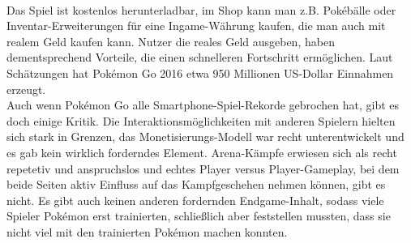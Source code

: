 \documentclass[extern,palatino]{cgBA}
\begin{document}
\\Das Spiel ist kostenlos herunterladbar, im Shop kann man z.B. Pokébälle oder Inventar-Erweiterungen für eine Ingame-Währung kaufen, die man auch mit realem Geld kaufen kann. Nutzer die reales Geld ausgeben, haben dementsprechend Vorteile, die einen schnelleren Fortschritt ermöglichen. Laut Schätzungen hat Pokémon Go 2016 etwa 950 Millionen US-Dollar Einnahmen erzeugt.%
\\Auch wenn Pokémon Go alle Smartphone-Spiel-Rekorde gebrochen hat, gibt es doch einige Kritik. Die Interaktionsmöglichkeiten mit anderen Spielern hielten sich stark in Grenzen, das Monetisierungs-Modell war recht unterentwickelt und es gab kein wirklich forderndes Element. Arena-Kämpfe erwiesen sich als recht repetetiv und anspruchslos und echtes Player versus Player-Gameplay, bei dem beide Seiten aktiv Einfluss auf das Kampfgeschehen nehmen können, gibt es nicht. Es gibt auch keinen anderen fordernden Endgame-Inhalt, sodass viele Spieler Pokémon erst trainierten, schließlich aber feststellen mussten, dass sie nicht viel mit den trainierten Pokémon machen konnten. %
\newpage
\end{document}
